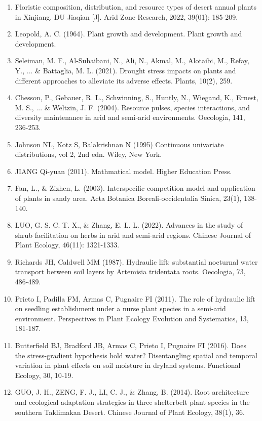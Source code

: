 \documentclass[11pt,a4paper]{ctexart}
\begin{document}
\begin{enumerate}
\item[{[1]}] Floristic composition, distribution, and resource types of desert annual plants in Xinjiang. DU Jiaqian [J]. Arid Zone Research, 2022, 39(01): 185-209.
\item[{[2]}] Leopold, A. C. (1964). Plant growth and development. Plant growth and development.
\item[{[3]}] Seleiman, M. F., Al-Suhaibani, N., Ali, N., Akmal, M., Alotaibi, M., Refay, Y., ... \& Battaglia, M. L. (2021). Drought stress impacts on plants and different approaches to alleviate its adverse effects. Plants, 10(2), 259.
\item[{[4]}] Chesson, P., Gebauer, R. L., Schwinning, S., Huntly, N., Wiegand, K., Ernest, M. S., ... \& Weltzin, J. F. (2004). Resource pulses, species interactions, and diversity maintenance in arid and semi-arid environments. Oecologia, 141, 236-253.
\item[{[5]}] Johnson NL, Kotz S, Balakrishnan N (1995) Continuous univariate distributions, vol 2, 2nd edn. Wiley, New York.
\item[{[6]}] JIANG Qi-yuan (2011). Mathmatical model. Higher Education Press.
\item[{[7]}] Fan, L., \& Zizhen, L. (2003). Interspecific competition model and application of plants in sandy area. Acta Botanica Boreali-occidentalia Sinica, 23(1), 138-140.
\item[{[8]}] LUO, G. S. C. T. X., \& Zhang, E. L. L. (2022). Advances in the study of shrub facilitation on herbs in arid and semi-arid regions. Chinese Journal of Plant Ecology, 46(11): 1321-1333.
\item[{[9]}] Richards JH, Caldwell MM (1987). Hydraulic lift: substantial nocturnal water transport between soil layers by Artemisia tridentata roots. Oecologia, 73, 486-489.
\item[{[10]}] Prieto I, Padilla FM, Armas C, Pugnaire FI (2011). The role of hydraulic lift on seedling establishment under a nurse plant species in a semi-arid environment. Perspectives in Plant Ecology Evolution and Systematics, 13, 181-187.
\item[{[11]}] Butterfield BJ, Bradford JB, Armas C, Prieto I, Pugnaire FI (2016). Does the stress-gradient hypothesis hold water? Disentangling spatial and temporal variation in plant effects on soil moisture in dryland systems. Functional Ecology, 30, 10-19.
\item[{[12]}] GUO, J. H., ZENG, F. J., LI, C. J., \& Zhang, B. (2014). Root architecture and ecological adaptation strategies in three shelterbelt plant species in the southern Taklimakan Desert. Chinese Journal of Plant Ecology, 38(1), 36.

\end{enumerate}
\end{document}
